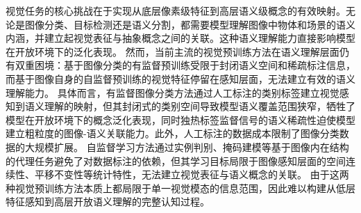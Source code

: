 视觉任务的核心挑战在于实现从底层像素级特征到高层语义级概念的有效映射。无论是图像分类、目标检测还是语义分割，都需要模型理解图像中物体和场景的语义内涵，并建立起视觉表征与抽象概念之间的关联。这种语义理解能力直接影响模型在开放环境下的泛化表现。
然而，当前主流的视觉预训练方法在语义理解层面仍有双重困境：基于图像分类的有监督预训练受限于封闭语义空间和稀疏标注信息，而基于图像自身的自监督预训练的视觉特征停留在感知层面，无法建立有效的语义理解能力。
具体而言，有监督图像分类方法通过人工标注的类别标签建立视觉感知到语义理解的映射，但其封闭式的类别空间导致模型语义覆盖范围狭窄，牺牲了模型在开放环境下的概念泛化表现，同时独热标签监督信号的语义稀疏性迫使模型建立粗粒度的图像-语义关联能力。此外，人工标注的数据成本限制了图像分类数据的大规模扩展。
自监督学习方法通过实例判别、掩码建模等基于图像内在结构的代理任务避免了对数据标注的依赖，但其学习目标局限于图像感知层面的空间连续性、平移不变性等统计特性，无法建立视觉表征与语义概念的关联。
由于这两种视觉预训练方法本质上都局限于单一视觉模态的信息范围，因此难以构建从低层特征感知到高层开放语义理解的完整认知过程。

